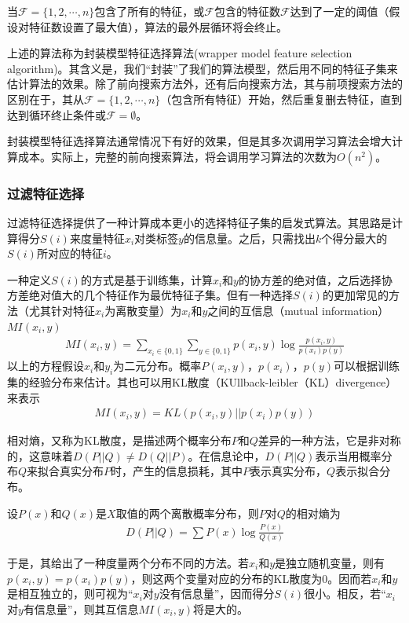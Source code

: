当$\mathcal{F}=\{1,2,\cdots,n\}$包含了所有的特征，或$\mathcal{F}$包含的特征数$\mathcal{F}$达到了一定的阈值（假设对特征数设置了最大值），算法的最外层循环将会终止。

上述的算法称为封装模型特征选择算法(wrapper model feature selection algorithm)。其含义是，我们“封装”了我们的算法模型，然后用不同的特征子集来估计算法的效果。除了前向搜索方法外，还有后向搜索方法，其与前项搜索方法的区别在于，其从$\mathcal{F}=\{1,2,\cdots,n\}$（包含所有特征）开始，然后重复删去特征，直到达到循环终止条件或$\mathcal{F}=\emptyset$。

封装模型特征选择算法通常情况下有好的效果，但是其多次调用学习算法会增大计算成本。实际上，完整的前向搜索算法，将会调用学习算法的次数为$O(n^2)$。

\subsubsection{过滤特征选择}
过滤特征选择提供了一种计算成本更小的选择特征子集的启发式算法。其思路是计算得分$S(i)$来度量特征$x_i$对类标签$y$的信息量。之后，只需找出$k$个得分最大的$S(i)$所对应的特征$i$。

一种定义$S(i)$的方式是基于训练集，计算$x_i$和$y$的协方差的绝对值，之后选择协方差绝对值大的几个特征作为最优特征子集。但有一种选择$S(i)$的更加常见的方法（尤其针对特征$x_i$为离散变量）为$x_i$和$y$之间的互信息（mutual information）$MI(x_i,y)$
\begin{eqnarray}
MI(x_i,y)=\sum_{x_i\in\{0,1\}}\sum_{y\in\{0,1\}}p(x_i,y)\log\frac{p(x_i,y)}{p(x_i)p(y)}
\end{eqnarray}
以上的方程假设$x_i$和$y_i$为二元分布。概率$P(x_i,y)$，$p(x_i)$，$p(y)$可以根据训练集的经验分布来估计。其也可以用KL散度（KUllback-leibler（KL）divergence）来表示
\begin{eqnarray}
MI(x_i,y)=KL(p(x_i,y)||p(x_i)p(y))
\end{eqnarray}

相对熵，又称为KL散度，是描述两个概率分布$P$和$Q$差异的一种方法，它是非对称的，这意味着$D(P||Q)\neq D(Q||P)$。在信息论中，$D(P||Q)$表示当用概率分布$Q$来拟合真实分布$P$时，产生的信息损耗，其中$P$表示真实分布，$Q$表示拟合分布。

设$P(x)$和$Q(x)$是$X$取值的两个离散概率分布，则$P$对$Q$的相对熵为
\begin{eqnarray}
D(P||Q)=\sum P(x)\log\frac{P(x)}{Q(x)}
\end{eqnarray}

于是，其给出了一种度量两个分布不同的方法。若$x_i$和$y$是独立随机变量，则有$p(x_i,y)=p(x_i)p(y)$，则这两个变量对应的分布的KL散度为0。因而若$x_i$和$y$是相互独立的，则可视为“$x_i$对$y$没有信息量”，因而得分$S(i)$很小。相反，若“$x_i$对$y$有信息量”，则其互信息$MI(x_i,y)$将是大的。

